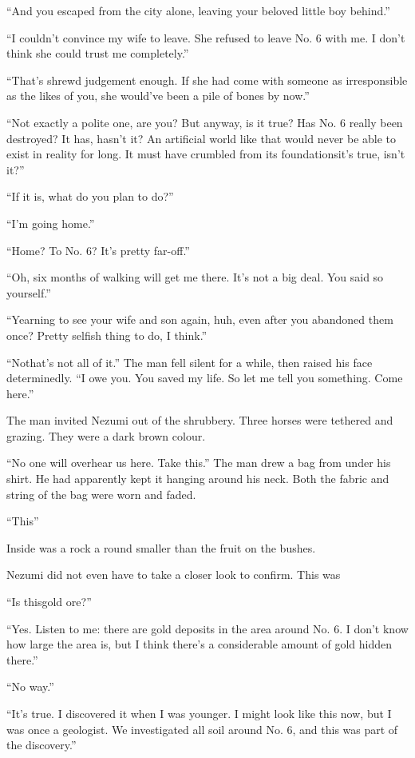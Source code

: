 ``And you escaped from the city alone, leaving your beloved little boy
behind.''

``I couldn't convince my wife to leave. She refused to leave No. 6 with
me. I don't think she could trust me completely.''

``That's shrewd judgement enough. If she had come with someone as
irresponsible as the likes of you, she would've been a pile of bones by
now.''

``Not exactly a polite one, are you? But anyway, is it true? Has No. 6
really been destroyed? It has, hasn't it? An artificial world like that
would never be able to exist in reality for long. It must have crumbled
from its foundations\el it's true, isn't it?''

``If it is, what do you plan to do?''

``I'm going home.''

``Home? To No. 6? It's pretty far-off.''

``Oh, six months of walking will get me there. It's not a big deal. You
said so yourself.''

``Yearning to see your wife and son again, huh, even after you abandoned
them once? Pretty selfish thing to do, I think.''

``No\el that's not all of it.'' The man fell silent for a while, then
raised his face determinedly. ``I owe you. You saved my life. So let me
tell you something. Come here.''

The man invited Nezumi out of the shrubbery. Three horses were tethered
and grazing. They were a dark brown colour.

``No one will overhear us here. Take this.'' The man drew a bag from
under his shirt. He had apparently kept it hanging around his neck. Both
the fabric and string of the bag were worn and faded.

``This\el ''

Inside was a rock a round smaller than the fruit on the bushes.

Nezumi did not even have to take a closer look to confirm. This was\el 

``Is this\el gold ore?''

``Yes. Listen to me: there are gold deposits in the area around No. 6. I
don't know how large the area is, but I think there's a considerable
amount of gold hidden there.''

``No way.''

``It's true. I discovered it when I was younger. I might look like this
now, but I was once a geologist. We investigated all soil around No. 6,
and this was part of the discovery.''

